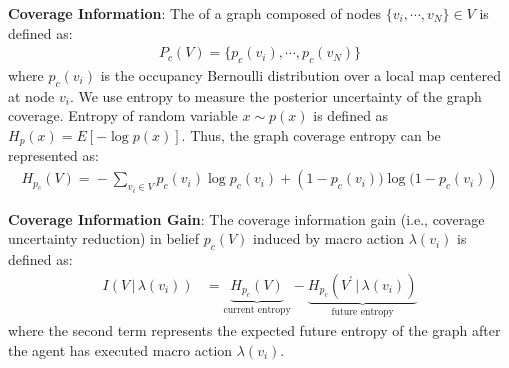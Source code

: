 \documentclass[letterpaper, 10pt, conference]{ieeeconf}      %
\newcommand{\ph}[1]{{\textbf{#1}:}} %
\newcommand{\rev}[1]{{\color{blue}#1}} %
\begin{document}


\ph{Coverage Information} The  of a graph composed of nodes $\{v_i, \cdots ,v_N\} \in V$ is defined as: 
\begin{align}
    \nonumber
    P_c(V) = \{p_c(v_i), \cdots , p_c(v_N)\}
\end{align}
where $p_c(v_i)$ is the occupancy Bernoulli distribution over a local map centered at node $v_i$. We use entropy to measure the posterior uncertainty of the graph coverage. Entropy of random variable $x\sim p(x)$ is defined as $H_p(x) = E[-\log p(x)]$. Thus, the graph coverage entropy can be represented as:
\begin{align}
    \nonumber
    H_{p_{c}}\!(V) \!=\! -\!\!\!\sum_{v_i \in V}\!\!
    p_{c}(v_i) \log p_{c}(v_i) 
    \!+\!
    \left(1-p_{c}(v_i)) \! \log (1-p_{c}(v_i)\right)
\end{align}

\ph{Coverage Information Gain}
The coverage information gain (i.e., coverage uncertainty reduction) in belief $p_{c}(V)$ induced by macro action $\lambda(v_i)$ is defined as:
\begin{align}
    I(V \, | \, \lambda(v_i)) &= \underbrace{H_{p_{c}}(V)}_\text{current entropy} - \underbrace{H_{p_{c}}(V^\prime \, | \, \lambda(v_i))}_\text{future entropy}
\end{align}
where the second term represents the expected future entropy of the graph after the agent has executed macro action $\lambda(v_i)$. 

\end{document}

